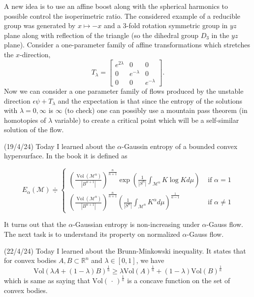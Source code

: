 \documentclass[12pt,a4paper]{article}
\newcommand{\R}{\mathbb{R}}
\begin{document}
A new idea is to use an affine boost along with the spherical harmonics to possible control the isoperimetric ratio. The considered example of a reducible group was generated by $ x \mapsto -x $ and a $ 3 $-fold rotation symmetric group in $ yz $ plane along with reflection of the triangle (so the dihedral group $ D_{3} $ in the $ yz $ plane). Consider a one-parameter family of affine transformations which stretches the $ x $-direction, 
\[ T_{\lambda} = \begin{bmatrix}
    e^{2\lambda} & 0 & 0 \\
    0 & e^{-\lambda} & 0 \\
    0 & 0 & e^{-\lambda}
\end{bmatrix}. \]
Now we can consider a one parameter family of flows produced by the unstable direction $ \epsilon \psi + T_{\lambda} $ and the expectation is that since the entropy of the solutions with $ \lambda = 0, \infty $ is $ \infty $ (to check) one can possibly use a mountain pass theorem (in homotopies of $ \lambda $ variable) to create a critical point which will be a self-similar solution of the flow.

(19/4/24) Today I learned about the $ \alpha $-Gaussin entropy of a bounded convex hypersurface. In the book it is defined as 

\[ E_\alpha(\mathcal{M}) \doteqdot \begin{cases}\left(\frac{\operatorname{Vol}\left(\mathcal{M}^n\right)}{\left|B^{n+1}\right|}\right)^{\frac{n}{n+1}} \exp \left(\frac{1}{\left|S^n\right|} \int_{\mathcal{M}^n} K \log K d \mu\right) & \text { if } \alpha=1 \\ \left(\frac{\operatorname{Vol}\left(\mathcal{M}^n\right)}{\left|B^{n+1}\right|}\right)^{\frac{n}{n+1}}\left(\frac{1}{\left|S^n\right|} \int_{\mathcal{M}^n} K^\alpha d \mu\right)^{\frac{1}{\alpha-1}} & \text { if } \alpha \neq 1\end{cases} \]

It turns out that the $ \alpha $-Gaussian entropy is non-increasing under $ \alpha $-Gauss flow. The next task is to understand its property on normalized $ \alpha $-Gauss flow.

(22/4/24) Today I learned about the Brunn-Minkowski inequality. It states that for convex bodies $ A, B \subset \R^{n} $ and $ \lambda \in [0,1] $, we have 
\[ \text{Vol}(\lambda A + (1- \lambda)B)^{\frac{1}{n}} \ge \lambda \text{Vol}(A)^{\frac{1}{n}} + (1 - \lambda)\text{Vol}(B)^{\frac{1}{n}} \]
which is same as saying that $ \text{Vol}(\, \cdot \,)^{\frac{1}{n}} $ is a concave function on the set of convex bodies.
\end{document}
